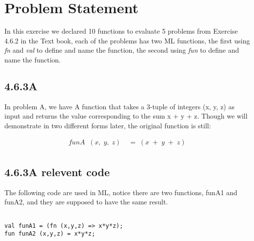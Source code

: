 \documentclass{report}
\begin{document}
\section{Problem Statement}
\label{sec:problem-statement-5}

In this exercise we declared 10 functions to evaluate 5 problems from
Exercise 4.6.2 in the Text book, each of the problems has two ML
functions, the first using \emph{fn} and \emph{val} to define and name the function,
the second using \emph{fun} to define and name the function.




\subsection{4.6.3A}
\label{sec:4.6.3a}
In problem A, we have A function that takes a 3-tuple of integers (x, y, z) as input and returns the value corresponding to the sum x + y + z. Though we will demonstrate in two different forms later, the original function is still:

\begin{align*}
  funA\;\; (x,\; y,\; z) \;&= \;(x\;+\;y\;+\;z)\\
\end{align*}

\subsection{4.6.3A relevent code}
\label{sec:4.6.3a-relevent-code}

The following code are used in ML, notice there are two functions, funA1 and funA2, and they are supposed to have the same result.
\lstset{frameround=fftt}
\begin{lstlisting}[frame=tRBL]

val funA1 = (fn (x,y,z) => x*y*z);
fun funA2 (x,y,z) = x*y*z;
\end{lstlisting}

\end{document}
